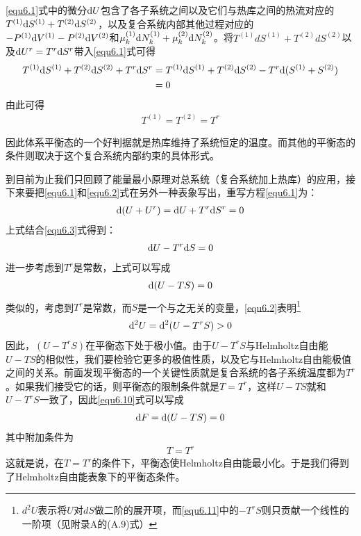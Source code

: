 \eqref{equ6.1}式中的微分$\mathrm{d} U$包含了各子系统之间以及它们与热库之间的热流对应的$T^{(1)} \mathrm{d} S^{(1)} + T^{(2)} \mathrm{d} S^{(2)}$，以及复合系统内部其他过程对应的$-P^{(1)} \mathrm{d} V^{(1)} - P^{(2)} \mathrm{d} V^{(2)}$和$\mu_k^{(1)} \mathrm{d} N_k^{(1)} + \mu_k^{(2)} \mathrm{d} N_k^{(2)}$。将$T^{(1)}dS^{(1)}+T^{(2)}dS^{(2)}$以及$\mathrm{d} U^r = T^r \mathrm{d} S^r$带入\eqref{equ6.1}式可得
\begin{align}\notag{}
	T^{(1)} \mathrm{d} S^{(1)} + T^{(2)} \mathrm{d} S^{(2)} + T^r \mathrm{d} S^r &= T^{(1)}\mathrm{d} S^{(1)} + T^{(2)} \mathrm{d} S^{(2)} - T^r \mathrm{d} (S^{(1)} + S^{(2)})\\
	& = 0	\label{equ6.6}
\end{align}
由此可得
\begin{align}\label{equ6.7}
	T^{(1)} = T^{(2)} = T^r
\end{align}

因此体系平衡态的一个好判据就是热库维持了系统恒定的温度。而其他的平衡态的条件则取决于这个复合系统内部约束的具体形式。

到目前为止我们只回顾了能量最小原理对总系统（复合系统加上热库）的应用，接下来要把\eqref{equ6.1}和\eqref{equ6.2}式在另外一种表象写出，重写方程\eqref{equ6.1}为：
\begin{align}\label{equ6.8}
	\mathrm{d} (U + U^r) = \mathrm{d} U + T^r \mathrm{d} S^r = 0 
\end{align}
上式结合\eqref{equ6.3}式得到：
\begin{align}\label{equ6.9}
	\mathrm{d} U - T^r \mathrm{d} S = 0
\end{align}
进一步考虑到$T^r$是常数，上式可以写成
\begin{align}\label{equ6.10}
	\mathrm{d} (U - TS) = 0
\end{align}
类似的，考虑到$T^r$是常数，而$S$是一个与之无关的变量，\eqref{equ6.2}表明\footnote{$d^2U$表示将$U$对$dS$做二阶的展开项，而\eqref{equ6.11}中的$-T^rS$则只贡献一个线性的一阶项（见附录A的(A.9)式）}
\begin{align}\label{equ6.11}
	\mathrm{d} ^2 U = \mathrm{d}^2 (U - T^r S) > 0
\end{align}
因此，$(U - T^r S)$在平衡态下处于极小值。由于$U - T^r S$与Helmholtz自由能$U-TS$的相似性，我们要检验它更多的极值性质，以及它与Helmholtz自由能极值之间的关系。前面发现平衡态的一个关键性质就是复合系统的各子系统温度都为$T^r$。如果我们接受它的话，则平衡态的限制条件就是$T = T^r$，这样$U - TS$就和$U - T^r S$一致了，因此\eqref{equ6.10}式可以写成
\begin{align}\label{equ6.12}
	\mathrm{d} F = \mathrm{d} (U - TS) = 0
\end{align}
其中附加条件为
\begin{align}\label{equ6.13}
	T = T^r
\end{align}
这就是说，在$T = T^r$的条件下，平衡态使Helmholtz自由能最小化。于是我们得到了Helmholtz自由能表象下的平衡态条件。

